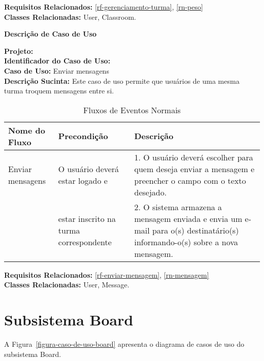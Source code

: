 \noindent  \textbf{Requisitos Relacionados:} \ref{rf-gerenciamento-turma}, \ref{rn-peso}       \\ \textbf{Classes Relacionadas:} User, Classroom.

\newpage
\clearpage
\begin{flushright}    \textbf{Descrição de Caso de Uso}   \end{flushright}         
\noindent \textbf{Projeto:} \imprimirtitulo  \\
\textbf{Identificador do Caso de Uso:} \UC\label{uc-enviar-mensagens} \\
\textbf{Caso de Uso:} Enviar mensagens \\
\noindent \textbf{Descrição Sucinta:} Este caso de uso permite que usuários de uma mesma turma troquem mensagens entre si.\\

\begin{table}[H]
	\centering \vspace{0.5cm} \footnotesize
	\caption{Fluxos de Eventos Normais}
	\begin{tabular}{|p{2.3cm}|p{2.5cm}|p{10cm}|} \hline  \rowcolor[rgb]{0.8,0.8,0.8}
		
		Nome do Fluxo & Precondição & Descrição  \\ \hline		
		
		Enviar mensagens & O usuário  deverá estar logado e& 1. O usuário deverá escolher para quem deseja enviar a mensagem e preencher o campo com o texto desejado. \\
		{} & estar inscrito na turma correspondente & 2. O sistema armazena a mensagem enviada e envia um e-mail para o(s) destinatário(s) informando-o(s) sobre a nova mensagem. \\ \hline
		
		
	\end{tabular}
\end{table}

\noindent  \textbf{Requisitos Relacionados:} \ref{rf-enviar-mensagem}, \ref{rn-mensagem}       \\ \textbf{Classes Relacionadas:} User, Message.

\newpage

\section{Subsistema Board}

A Figura~\ref{figura-caso-de-uso-board} apresenta o diagrama de casos de uso do subsistema Board.

